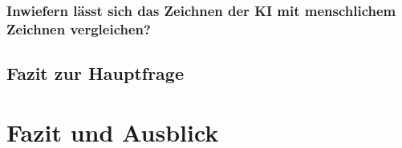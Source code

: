 \subsubsection*{Inwiefern lässt sich das Zeichnen der KI mit menschlichem Zeichnen vergleichen?}

\subsection{Fazit zur Hauptfrage}

\section{Fazit und Ausblick}







